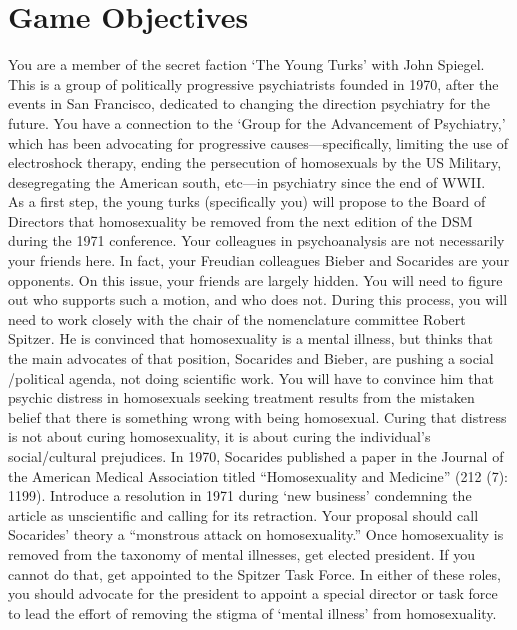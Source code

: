 \section{Game Objectives}
\label{gameobjectives}

You are a member of the secret faction `The Young Turks' with John Spiegel. This is a group of politically progressive psychiatrists founded in 1970, after the events in San Francisco, dedicated to changing the direction psychiatry for the future. You have a connection to the `Group for the Advancement of Psychiatry,' which has been advocating for progressive causes—specifically, limiting the use of electroshock therapy, ending the persecution of homosexuals by the US Military, desegregating the American south, etc—in psychiatry since the end of WWII.\\
As a first step, the young turks (specifically you) will propose to the Board of Directors that homosexuality be removed from the next edition of the DSM during the 1971 conference. Your colleagues in psychoanalysis are not necessarily your friends here. In fact, your Freudian colleagues Bieber and Socarides are your opponents. On this issue, your friends are largely hidden. You will need to figure out who supports such a motion, and who does not.
During this process, you will need to work closely with the chair of the nomenclature committee Robert Spitzer. He is convinced that homosexuality is a mental illness, but thinks that the main advocates of that position, Socarides and Bieber, are pushing a social \slash  political agenda, not doing scientific work. You will have to convince him that psychic distress in homosexuals seeking treatment results from the mistaken belief that there is something wrong with being homosexual. Curing that distress is not about curing homosexuality, it is about curing the individual's social\slash cultural prejudices.
In 1970, Socarides published a paper in the Journal of the American Medical Association titled “Homosexuality and Medicine” (212 (7): 1199). Introduce a resolution in 1971 during ‘new business’ condemning the article as unscientific and calling for its retraction. Your proposal should call Socarides' theory a “monstrous attack on homosexuality.”
Once homosexuality is removed from the taxonomy of mental illnesses, get elected president. If you cannot do that, get appointed to the Spitzer Task Force. In either of these roles, you should advocate for the president to appoint a special director or task force to lead the effort of removing the stigma of `mental illness' from homosexuality.
